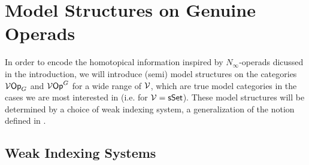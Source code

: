 \documentclass[a4paper,10pt]{article}%
\begin{document}
\section{Model Structures on Genuine Operads}
\renewcommand{\F}{\ensuremath{\mathcal F}}


In order to encode the homotopical information inspired by $N_\infty$-operads dicussed in the introduction, we will introduce (semi) model structures on the categories $\mathcal V\mathsf{Op}_G$ and $\mathcal V\mathsf{Op}^G$ for a wide range of $\mathcal V$, which are true model categories in the cases we are most interested in (i.e. for $\mathcal V = \mathsf{sSet}$).  These model structures will be determined by a choice of weak indexing system, a generalization of the notion defined in \cite{BH15}. 


\subsection{Weak Indexing Systems}
\end{document}

